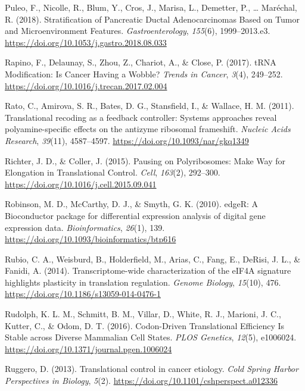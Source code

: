 \documentclass[12pt,openany]{book}
\begin{document}
\hypertarget{ref-Puleo2018}{}
Puleo, F., Nicolle, R., Blum, Y., Cros, J., Marisa, L., Demetter, P.,
\ldots{} Maréchal, R. (2018). Stratification of Pancreatic Ductal
Adenocarcinomas Based on Tumor and Microenvironment Features.
\emph{Gastroenterology}, \emph{155}(6), 1999--2013.e3.
\url{https://doi.org/10.1053/j.gastro.2018.08.033}

\hypertarget{ref-Rapino2017}{}
Rapino, F., Delaunay, S., Zhou, Z., Chariot, A., \& Close, P. (2017).
tRNA Modification: Is Cancer Having a Wobble? \emph{Trends in Cancer},
\emph{3}(4), 249--252.
\url{https://doi.org/10.1016/j.trecan.2017.02.004}

\hypertarget{ref-Rato2011}{}
Rato, C., Amirova, S. R., Bates, D. G., Stansfield, I., \& Wallace, H.
M. (2011). Translational recoding as a feedback controller: Systems
approaches reveal polyamine-specific effects on the antizyme ribosomal
frameshift. \emph{Nucleic Acids Research}, \emph{39}(11), 4587--4597.
\url{https://doi.org/10.1093/nar/gkq1349}

\hypertarget{ref-Richter2015}{}
Richter, J. D., \& Coller, J. (2015). Pausing on Polyribosomes: Make Way
for Elongation in Translational Control. \emph{Cell}, \emph{163}(2),
292--300. \url{https://doi.org/10.1016/j.cell.2015.09.041}

\hypertarget{ref-Robinson2010}{}
Robinson, M. D., McCarthy, D. J., \& Smyth, G. K. (2010). edgeR: A
Bioconductor package for differential expression analysis of digital
gene expression data. \emph{Bioinformatics}, \emph{26}(1), 139.
\url{https://doi.org/10.1093/bioinformatics/btp616}

\hypertarget{ref-Rubio2014}{}
Rubio, C. A., Weisburd, B., Holderfield, M., Arias, C., Fang, E.,
DeRisi, J. L., \& Fanidi, A. (2014). Transcriptome-wide characterization
of the eIF4A signature highlights plasticity in translation regulation.
\emph{Genome Biology}, \emph{15}(10), 476.
\url{https://doi.org/10.1186/s13059-014-0476-1}

\hypertarget{ref-Rudolph2016}{}
Rudolph, K. L. M., Schmitt, B. M., Villar, D., White, R. J., Marioni, J.
C., Kutter, C., \& Odom, D. T. (2016). Codon-Driven Translational
Efficiency Is Stable across Diverse Mammalian Cell States. \emph{PLOS
Genetics}, \emph{12}(5), e1006024.
\url{https://doi.org/10.1371/journal.pgen.1006024}

\hypertarget{ref-Ruggero2013}{}
Ruggero, D. (2013). Translational control in cancer etiology. \emph{Cold
Spring Harbor Perspectives in Biology}, \emph{5}(2).
\url{https://doi.org/10.1101/cshperspect.a012336}
\end{document}
